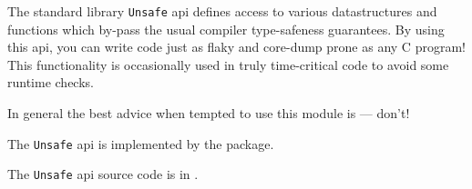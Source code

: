 
The standard library {\tt Unsafe} api defines access to various datastructures 
and functions which by-pass the usual compiler type-safeness guarantees.  By 
using this api, you can write code just as flaky and core-dump prone as any 
C program!  This functionality is occasionally used in truly time-critical code 
to avoid some runtime checks.

In general the best advice when tempted to use this module is --- don't!

The {\tt Unsafe} api is implemented by the  package.

The {\tt Unsafe} api source code is in .

